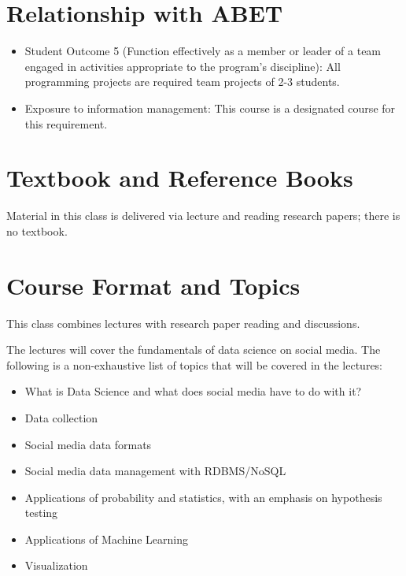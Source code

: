 \documentclass[11pt,article,oneside]{memoir} %
\begin{document}

\section{Relationship with ABET}%

\begin{itemize}
    \item Student Outcome 5 (Function effectively as a member or leader of a team engaged in
    activities appropriate to the program's discipline): All programming projects are required
    team projects of 2-3 students.
    \item Exposure to information management: This course is a designated course for this
    requirement.
\end{itemize}


\section{Textbook and Reference Books}

Material in this class is delivered via lecture and reading research papers; there is no
textbook.

\section{Course Format and Topics}

This class combines lectures with research paper reading and discussions.

The lectures will cover the fundamentals of data science on social media.
The following is a non-exhaustive list of topics that will be covered in the lectures:

\begin{itemize}
    \item What is Data Science and what does social media have to do with it?
    \item Data collection
    \item Social media data formats
    \item Social media data management with RDBMS/NoSQL
    \item Applications of probability and statistics, with an emphasis on hypothesis testing
    \item Applications of Machine Learning
    \item Visualization
\end{itemize}
\end{document}
